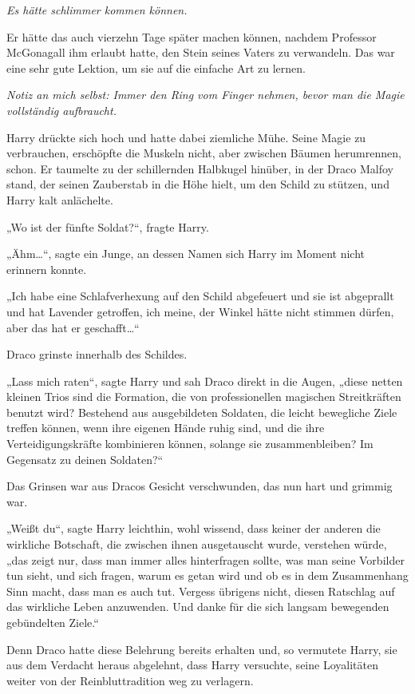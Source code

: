 {\emph{Es hätte schlimmer kommen können.}

Er hätte das auch vierzehn Tage später machen können, nachdem Professor McGonagall ihm erlaubt hatte, den Stein seines Vaters zu verwandeln. Das war eine sehr gute Lektion, um sie auf die einfache Art zu lernen.

\emph{Notiz an mich selbst: Immer den Ring vom Finger nehmen, bevor man die Magie vollständig aufbraucht.}

Harry drückte sich hoch und hatte dabei ziemliche Mühe. Seine Magie zu verbrauchen, erschöpfte die Muskeln nicht, aber zwischen Bäumen herumrennen, schon. Er taumelte zu der schillernden Halbkugel hinüber, in der Draco Malfoy stand, der seinen Zauberstab in die Höhe hielt, um den Schild zu stützen, und Harry kalt anlächelte.

„Wo ist der fünfte Soldat?“, fragte Harry.

„Ähm…“, sagte ein Junge, an dessen Namen sich Harry im Moment nicht erinnern konnte.

„Ich habe eine Schlafverhexung auf den Schild abgefeuert und sie ist abgeprallt und hat Lavender getroffen, ich meine, der Winkel hätte nicht stimmen dürfen, aber das hat er geschafft…“

Draco grinste innerhalb des Schildes.

„Lass mich raten“, sagte Harry und sah Draco direkt in die Augen, „diese netten kleinen Trios sind die Formation, die von professionellen magischen Streitkräften benutzt wird? Bestehend aus ausgebildeten Soldaten, die leicht bewegliche Ziele treffen können, wenn ihre eigenen Hände ruhig sind, und die ihre Verteidigungskräfte kombinieren können, solange sie zusammenbleiben? Im Gegensatz zu deinen Soldaten?“

Das Grinsen war aus Dracos Gesicht verschwunden, das nun hart und grimmig war.

„Weißt du“, sagte Harry leichthin, wohl wissend, dass keiner der anderen die wirkliche Botschaft, die zwischen ihnen ausgetauscht wurde, verstehen würde, „das zeigt nur, dass man immer alles hinterfragen sollte, was man seine Vorbilder tun sieht, und sich fragen, warum es getan wird und ob es in dem Zusammenhang Sinn macht, dass man es auch tut. Vergess übrigens nicht, diesen Ratschlag auf das wirkliche Leben anzuwenden. Und danke für die sich langsam bewegenden gebündelten Ziele.“

Denn Draco hatte diese Belehrung bereits erhalten und, so vermutete Harry, sie aus dem Verdacht heraus abgelehnt, dass Harry versuchte, seine Loyalitäten weiter von der Reinbluttradition weg zu verlagern.

}
